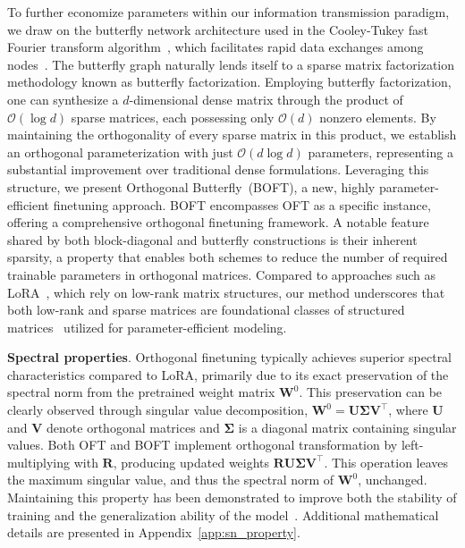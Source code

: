 To further economize parameters within our information transmission paradigm, we draw on the butterfly network architecture used in the Cooley-Tukey fast Fourier transform algorithm~\cite{cooley1965algorithm}, which facilitates rapid data exchanges among nodes~\cite{klasing1994broadcasting}. The butterfly graph naturally lends itself to a sparse matrix factorization methodology known as butterfly factorization. Employing butterfly factorization, one can synthesize a $d$-dimensional dense matrix through the product of $\mathcal{O}(\log d)$ sparse matrices, each possessing only $\mathcal{O}(d)$ nonzero elements. By maintaining the orthogonality of every sparse matrix in this product, we establish an orthogonal parameterization with just $\mathcal{O}(d\log d)$ parameters, representing a substantial improvement over traditional dense formulations. Leveraging this structure, we present Orthogonal Butterfly~(BOFT), a new, highly parameter-efficient finetuning approach. BOFT encompasses OFT as a specific instance, offering a comprehensive orthogonal finetuning framework. A notable feature shared by both block-diagonal and butterfly constructions is their inherent sparsity, a property that enables both schemes to reduce the number of required trainable parameters in orthogonal matrices. Compared to approaches such as LoRA~\cite{hulora2022}, which rely on low-rank matrix structures, our method underscores that both low-rank and sparse matrices are foundational classes of structured matrices~\cite{candes2011robust} utilized for parameter-efficient modeling.

\textbf{Spectral properties}. Orthogonal finetuning typically achieves superior spectral characteristics compared to LoRA, primarily due to its exact preservation of the spectral norm from the pretrained weight matrix $\bm{W}^0$. This preservation can be clearly observed through singular value decomposition, $\bm{W}^0=\bm{U}\bm{\Sigma}\bm{V}^\top$, where $\bm{U}$ and $\bm{V}$ denote orthogonal matrices and $\bm{\Sigma}$ is a diagonal matrix containing singular values. Both OFT and BOFT implement orthogonal transformation by left-multiplying with $\bm{R}$, producing updated weights $\bm{R}\bm{U}\bm{\Sigma}\bm{V}^\top$. This operation leaves the maximum singular value, and thus the spectral norm of $\bm{W}^0$, unchanged. Maintaining this property has been demonstrated to improve both the stability of training and the generalization ability of the model~\cite{miyato2018spectral,yoshida2017spectral}. Additional mathematical details are presented in Appendix~\ref{app:sn_property}.